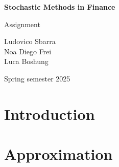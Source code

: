 \documentclass[a4paper, 12pt]{article}
\begin{document}
 

\begin{titlepage}
    \centering
    \vspace*{2cm}
    \Huge
    \textbf{Stochastic Methods in Finance}
    
    \vspace{1cm}
    \LARGE
	 Assignment

    \vfill
    \vspace{1cm}
    \Large
	 Ludovico Sbarra \\
	 Noa Diego Frei \\
	 Luca Boshung
    
    
    \vfill
    \Large
    Spring semester 2025
    
    \vspace*{1cm}
\end{titlepage}

\pagebreak

\section{Introduction}
\label{sec:Introduction}

\section{Approximation}%
\label{sec:Approximation}
\end{document}

